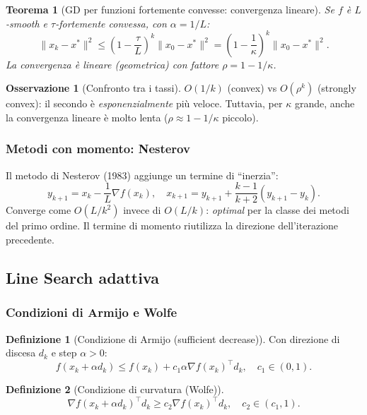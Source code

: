 \documentclass[11pt, a4paper, twoside]{book}
\theoremstyle{definition}
\newtheorem{defn}{Definizione}[chapter]
\newtheorem{remark}{Osservazione}[chapter]
\theoremstyle{plain}
\newtheorem{thm}{Teorema}[chapter]
\theoremstyle{remark}
\begin{document}
\begin{thm}[GD per funzioni fortemente convesse: convergenza lineare]
Se $f$ è $L$-smooth e $\tau$-fortemente convessa, con $\alpha = 1/L$:
\[
  \|x_k - x^*\|^2 \leq \left(1 - \frac{\tau}{L}\right)^k \|x_0 - x^*\|^2 = \left(1 - \frac{1}{\kappa}\right)^k \|x_0 - x^*\|^2.
\]
La convergenza è lineare (geometrica) con fattore $\rho = 1 - 1/\kappa$.
\end{thm}

\begin{remark}[Confronto tra i tassi]
$O(1/k)$ (convex) vs $O(\rho^k)$ (strongly convex): il secondo è \emph{esponenzialmente} più veloce. Tuttavia, per $\kappa$ grande, anche la convergenza lineare è molto lenta ($\rho \approx 1 - 1/\kappa$ piccolo).
\end{remark}

\subsubsection{Metodi con momento: Nesterov}

Il metodo di Nesterov (1983) aggiunge un termine di ``inerzia'':
\[
  y_{k+1} = x_k - \frac{1}{L}\nabla f(x_k), \quad x_{k+1} = y_{k+1} + \frac{k-1}{k+2}(y_{k+1} - y_k).
\]
Converge come $O(L/k^2)$ invece di $O(L/k)$: \emph{optimal} per la classe dei metodi del primo ordine. Il termine di momento riutilizza la direzione dell'iterazione precedente.

\subsection{Line Search adattiva}

\subsubsection{Condizioni di Armijo e Wolfe}

\begin{defn}[Condizione di Armijo (sufficient decrease)]
Con direzione di discesa $d_k$ e step $\alpha > 0$:
\[
  f(x_k + \alpha d_k) \leq f(x_k) + c_1 \alpha \nabla f(x_k)^\top d_k, \quad c_1 \in (0, 1).
\]
\end{defn}

\begin{defn}[Condizione di curvatura (Wolfe)]
\[
  \nabla f(x_k + \alpha d_k)^\top d_k \geq c_2 \nabla f(x_k)^\top d_k, \quad c_2 \in (c_1, 1).
\]
\end{defn}
\end{document}
